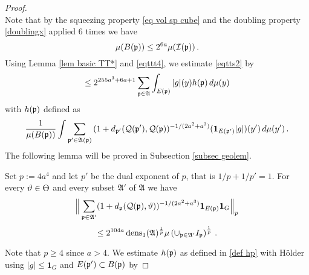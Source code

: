 {\begin{proof}
\begin{equation}
\end{equation}
Note that by the squeezing property \eqref{eq vol sp cube}
and the doubling property \eqref{doublingx} applied
$6$ times we have
\begin{equation}\label{eqttt4}
    \mu(B(\mathfrak p))\le 2^{6a} \mu(\mathcal{I}(\mathfrak p))\, .
\end{equation}
Using Lemma \ref{lem basic TT*} and \eqref{eqttt4}, we estimate \eqref{eqtts2} by
\begin{equation}\label{eqtts3}
     \le  2^{255a^3+6a+1} \sum_{\mathfrak p\in \mathfrak{A}}
    \int_{E(\mathfrak p)}|g|(y) h(\mathfrak p)\, d\mu(y)
\end{equation}
with $h(\mathfrak p)$ defined as
\begin{equation}\label{def hp}
    \frac 1{\mu(B(\mathfrak p))}\int \sum_{\mathfrak p'\in \mathfrak{A}(\mathfrak p)}
    {(1+d_{\mathfrak p'}(\mathcal{Q}(\mathfrak p'), \mathcal{Q}(\mathfrak p))^{-1/(2a^2+a^3)}}(\mathbf{1}_{E(\mathfrak p')}|g|)(y')\, d\mu(y')\,.
\end{equation}
The following lemma will be proved in Subsection \ref{subsec geolem}.
\begin{lemma}
    \label{lem antichain 1}
    Set $p:=4a^4$ and let $p'$ be the dual exponent of $p$, that is $1/p+1/p'=1$.
    For  every $\vartheta\in\Theta$ and every subset $\mathfrak{A}'$ of $\mathfrak{A}$ we have
    \begin{equation}
        \label{eq antichain Lp}
        \Big\|\sum_{\mathfrak p\in\mathfrak{A}'}(1+d_{\mathfrak p}(\mathcal{Q}(\mathfrak p), \vartheta))^{-1/(2a^2+a^3)}\mathbf{1}_{E(\mathfrak p)}\mathbf{1}_G\Big\|_{p}
    \end{equation}
    \begin{equation}
        \le
        2^{104a}\operatorname{\operatorname{dens}}_1(\mathfrak{A})^{\frac 1p}\mu\left(\cup_{\mathfrak p\in\mathfrak{A}'}I_{\mathfrak p}\right)^{\frac 1p}\, .
    \end{equation}
\end{lemma}

Note that $p\geq 4$ since $a>4$.
We estimate $h(\mathfrak p)$ as defined in \eqref{def hp} with H\"older using  $|g|\le \mathbf{1}_G$ and $E(\mathfrak p')\subset B(\mathfrak p)$ by


\end{proof}}
